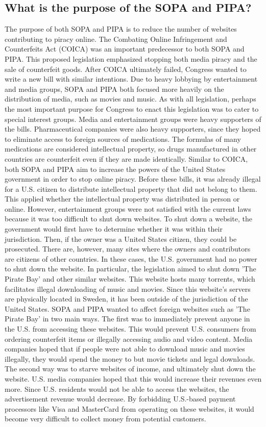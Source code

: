 \documentclass[11pt,journal,compsoc]{IEEEtran}
\begin{document}
\subsection{What is the purpose of the SOPA and PIPA?}
The purpose of both SOPA and PIPA is to reduce the number of websites contributing to piracy online. The Combating Online Infringement and Counterfeits Act (COICA) was an important predecessor to both SOPA and PIPA. This proposed legislation emphasized stopping both media piracy and the sale of counterfeit goods. After COICA ultimately failed, Congress wanted to write a new bill with similar intentions. Due to heavy lobbying by entertainment and media groups, SOPA and PIPA both focused more heavily on the distribution of media, such as movies and music.  
As with all legislation, perhaps the most important purpose for Congress to enact this legislation was to cater to special interest groups. Media and entertainment groups were heavy supporters of the bills. Pharmaceutical companies were also heavy supporters, since they hoped to eliminate access to foreign sources of medications. The formulas of many medications are considered intellectual property, so drugs manufactured in other countries are counterfeit even if they are made identically. 
Similar to COICA, both SOPA and PIPA aim to increase the powers of the United States government in order to stop online piracy. Before these bills, it was already illegal for a U.S. citizen to distribute intellectual property that did not belong to them. This applied whether the intellectual property was distributed in person or online. However, entertainment groups were not satisfied with the current laws because it was too difficult to shut down websites. To shut down a website, the government would first have to determine whether it was within their jurisdiction. Then, if the owner was a United States citizen, they could be prosecuted. There are, however, many sites where the owners and contributors are citizens of other countries. In these cases, the U.S. government had no power to shut down the website. In particular, the legislation aimed to shut down 'The Pirate Bay' and other similar websites. This website hosts many torrents, which facilitates illegal downloading of music and movies. Since this website's servers are physically located in Sweden, it has been outside of the jurisdiction of the United States. 
SOPA and PIPA wanted to affect foreign websites such as 'The Pirate Bay' in two main ways. The first was to immediately prevent anyone in the U.S. from accessing these websites. This would prevent U.S. consumers from ordering counterfeit items or illegally accessing audio and video content. Media companies hoped that if people were not able to download music and movies illegally, they would spend the money to but movie tickets and legal downloads. The second way was to starve websites of income, and ultimately shut down the website. U.S. media companies hoped that this would increase their revenues even more. Since U.S. residents would not be able to access the websites, the advertisement revenue would decrease. By forbidding U.S.-based payment processors like Visa and MasterCard from operating on these websites, it would become very difficult to collect money from potential customers.  
\end{document}
